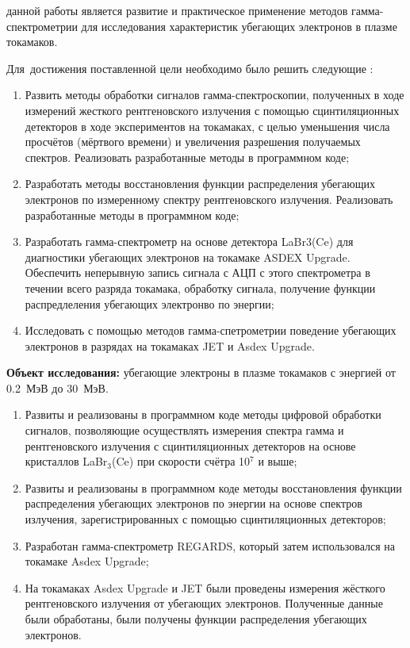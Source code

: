 

{\aim} данной работы является развитие и практическое применение методов гамма-спектрометрии для исследования характеристик убегающих электронов в плазме токамаков.

Для~достижения поставленной цели необходимо было решить следующие {\tasks}:
\begin{enumerate}[beginpenalty=10000] %
  \item Развить методы обработки сигналов гамма-спектроскопии, полученных в ходе измерений жесткого рентгеновского излучения с помощью сцинтиляционных детекторов в ходе экспериментов на токамаках, с целью уменьшения числа просчётов (мёртвого времени) и увеличения разрешения получаемых спектров. Реализовать разработанные методы в программном коде;
  \item Разработать методы восстановления функции распределения убегающих электронов по измеренному спектру рентгеновского излучения. Реализовать разработанные методы в программном коде;
  \item Разработать гамма-спектрометр на основе детектора LaBr3(Ce) для диагностики убегающих электронов на токамаке ASDEX Upgrade. Обеспечить неперывную запись сигнала с АЦП с этого спектрометра в течении всего разряда токамака, обработку сигнала, получение функции распредлеления убегающих электронво по энергии;
  \item Исследовать с помощью методов гамма-спетрометрии поведение убегающих электронов в разрядах на токамаках JET и Asdex Upgrade.
\end{enumerate}

\textbf{Объект исследования:} убегающие электроны в плазме токамаков с энергией от 0.2~МэВ до 30~МэВ.

{\novelty}
\begin{enumerate}[beginpenalty=10000] %
  \item Развиты и реализованы в программном коде методы цифровой обработки сигналов, позволяющие осуществлять измерения спектра гамма и рентгеновского излучения с сцинтиляционных детекторов на основе кристаллов LaBr${}_3$(Ce) при скорости счётра 10${}^7$ и выше;
  \item Развиты и реализованы в программном коде методы восстановления функции распределения убегающих электронов по энергии на основе спектров излучения, зарегистрированных с помощью сцинтиляционных детекторов;
  \item Разработан гамма-спектрометр REGARDS, который затем использовался на токамаке Asdex Upgrade;
  \item На токамаках Asdex Upgrade и JET были проведены измерения  жёсткого рентгеновского излучения от убегающих электронов. Полученные данные были обработаны, были получены функции распределения убегающих электронов. 
\end{enumerate}

